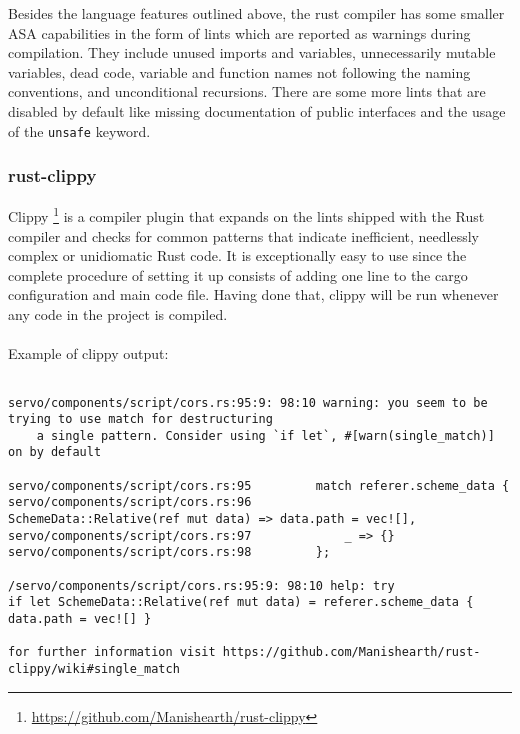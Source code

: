 \documentclass{scrartcl}
\begin{document}
Besides the language features outlined above, the rust compiler has some smaller ASA capabilities in the form of lints which are reported as warnings during compilation. They include unused imports and variables, unnecessarily mutable variables, dead code, variable and function names not following the naming conventions, and unconditional recursions. There are some more lints that are disabled by default like missing documentation of public interfaces and the usage of the \texttt{unsafe} keyword.

\subsubsection{rust-clippy} \label{clippy}

Clippy \footnote{\url{https://github.com/Manishearth/rust-clippy}} is a compiler plugin that expands on the lints shipped with the Rust compiler and checks for common patterns that indicate inefficient, needlessly complex or unidiomatic Rust code. It is exceptionally easy to use since the complete procedure of setting it up consists of adding one line to the cargo configuration and main code file. Having done that, clippy will be run whenever any code in the project is compiled.\\
\\

Example of clippy output:
{
\scriptsize
\begin{verbatim}

servo/components/script/cors.rs:95:9: 98:10 warning: you seem to be trying to use match for destructuring
    a single pattern. Consider using `if let`, #[warn(single_match)] on by default
    
servo/components/script/cors.rs:95         match referer.scheme_data {
servo/components/script/cors.rs:96             SchemeData::Relative(ref mut data) => data.path = vec![],
servo/components/script/cors.rs:97             _ => {}
servo/components/script/cors.rs:98         };

/servo/components/script/cors.rs:95:9: 98:10 help: try
if let SchemeData::Relative(ref mut data) = referer.scheme_data { data.path = vec![] }

for further information visit https://github.com/Manishearth/rust-clippy/wiki#single_match

\end{verbatim}
}
\end{document}

